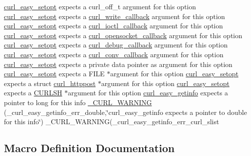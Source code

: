 \begin{DoxyCompactItemize}
\hyperlink{easy_8h_a7b171739b7bb728b3b58b2e6ec454aa0}{curl\+\_\+easy\+\_\+setopt} expects a curl\+\_\+off\+\_\+t argument for this option \hyperlink{easy_8h_a7b171739b7bb728b3b58b2e6ec454aa0}{curl\+\_\+easy\+\_\+setopt} expects a \hyperlink{curl_8h_ad65e62dcde45b356254b0f25f38dd802}{curl\+\_\+write\+\_\+callback} argument for this option \hyperlink{easy_8h_a7b171739b7bb728b3b58b2e6ec454aa0}{curl\+\_\+easy\+\_\+setopt} expects a \hyperlink{curl_8h_ae0524f6ec082005e39eb275c71c59a3b}{curl\+\_\+ioctl\+\_\+callback} argument for this option \hyperlink{easy_8h_a7b171739b7bb728b3b58b2e6ec454aa0}{curl\+\_\+easy\+\_\+setopt} expects a \hyperlink{curl_8h_a1b8b8f3e1a4e538a6bb1dd83a3388547}{curl\+\_\+opensocket\+\_\+callback} argument for this option \hyperlink{easy_8h_a7b171739b7bb728b3b58b2e6ec454aa0}{curl\+\_\+easy\+\_\+setopt} expects a \hyperlink{curl_8h_a50147c55283ee1fa3322b0d5aff2326c}{curl\+\_\+debug\+\_\+callback} argument for this option \hyperlink{easy_8h_a7b171739b7bb728b3b58b2e6ec454aa0}{curl\+\_\+easy\+\_\+setopt} expects a \hyperlink{curl_8h_acb230bf6dbf7bcb6e4e8740ea42ca3b3}{curl\+\_\+conv\+\_\+callback} argument for this option \hyperlink{easy_8h_a7b171739b7bb728b3b58b2e6ec454aa0}{curl\+\_\+easy\+\_\+setopt} expects a private data pointer as argument for this option \hyperlink{easy_8h_a7b171739b7bb728b3b58b2e6ec454aa0}{curl\+\_\+easy\+\_\+setopt} expects a F\+I\+L\+E $\ast$argument for this option \hyperlink{easy_8h_a7b171739b7bb728b3b58b2e6ec454aa0}{curl\+\_\+easy\+\_\+setopt} expects a struct \hyperlink{structcurl__httppost}{curl\+\_\+httppost} $\ast$argument for this option \hyperlink{easy_8h_a7b171739b7bb728b3b58b2e6ec454aa0}{curl\+\_\+easy\+\_\+setopt} expects a \hyperlink{curl_8h_a746d4e7ba89fe28a008e91cffb343ef0}{C\+U\+R\+L\+S\+H} $\ast$argument for this option \hyperlink{easy_8h_ae395d1ab3a14e03800b6aa89744aec4c}{curl\+\_\+easy\+\_\+getinfo} expects a pointer to long for this info \hyperlink{typecheck-gcc_8h_af0e68b2e6d33faf4c40e004cda04ca30}{\+\_\+\+C\+U\+R\+L\+\_\+\+W\+A\+R\+N\+I\+N\+G} (\+\_\+curl\+\_\+easy\+\_\+getinfo\+\_\+err\+\_\+double,\char`\"{}curl\+\_\+easy\+\_\+getinfo expects a pointer to double for this info\char`\"{}) \+\_\+\+C\+U\+R\+L\+\_\+\+W\+A\+R\+N\+I\+N\+G(\+\_\+curl\+\_\+easy\+\_\+getinfo\+\_\+err\+\_\+curl\+\_\+slist
\end{DoxyCompactItemize}


\subsection{Macro Definition Documentation}
\hypertarget{typecheck-gcc_8h_ab17970011d84bb174c2ad1e11361da88}{}
